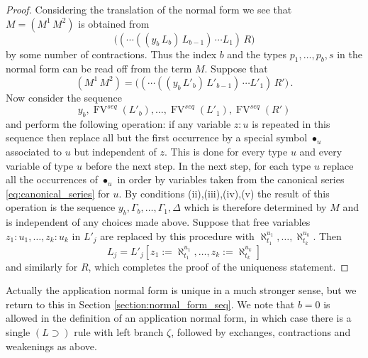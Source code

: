 \documentclass[english,letter paper,12pt,leqno]{article}
\theoremstyle{example}
\numberwithin{equation}{section}
\def\be{\begin{equation}}
\def\ee{\end{equation}}
\def\imp{\supset}
\begin{document}
\begin{proof}
Considering the translation of the normal form we see that $M = (M^1\, M^2)$ is obtained from
\be\label{eq:normal_form_app_term}
\big( (\cdots( (y_b \, L_b) \, L_{b-1} ) \, \cdots L_1) \, R\big)
\ee
by some number of contractions. Thus the index $b$ and the types $p_1,\ldots,p_b,s$ in the normal form can be read off from the term $M$. Suppose that
\be\label{eq:normal_form_app_term2}
(M^1\, M^2) = \big( (\cdots( (y_b \, L'_b) \, L'_{b-1} ) \, \cdots L'_1) \, R'\big)\,.
\ee
Now consider the sequence
\be
y_b,\operatorname{FV}^{seq}(L'_b),\ldots,\operatorname{FV}^{seq}(L'_1), \operatorname{FV}^{seq}(R')
\ee
and perform the following operation: if any variable $z:u$ is repeated in this sequence then replace all but the first occurrence by a special symbol $\bullet_u$ associated to $u$ but independent of $z$. This is done for every type $u$ and every variable of type $u$ before the next step. In the next step, for each type $u$ replace all the occurrences of $\bullet_u$ in order by variables taken from the canonical series \eqref{eq:canonical_series} for $u$. By conditions (ii),(iii),(iv),(v) the result of this operation is the sequence $y_b,\Gamma_b,\ldots,\Gamma_1,\Delta$ which is therefore determined by $M$ and is independent of any choices made above. Suppose that free variables $z_1:u_1,\ldots,z_k:u_k$ in $L'_j$ are replaced by this procedure with $\aleph^{u_1}_{t_1},\ldots,\aleph^{u_k}_{t_k}$. Then
\[
L_j = L'_j[ z_1 := \aleph^{u_1}_{t_1}, \ldots, z_k := \aleph^{u_k}_{t_k} ]
\]
and similarly for $R$, which completes the proof of the uniqueness statement.
\end{proof}

Actually the application normal form is unique in a much stronger sense, but we return to this in Section \ref{section:normal_form_seq}. We note that $b = 0$ is allowed in the definition of an application normal form, in which case there is a single $(L \imp)$ rule with left branch $\zeta$, followed by exchanges, contractions and weakenings as above.
\end{document}

